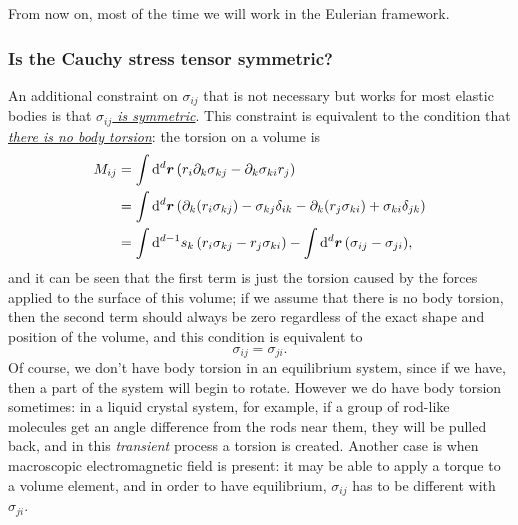 \documentclass[hyperref, a4paper]{article}
\begin{document}
From now on, most of the time we will work in the Eulerian framework.

\subsubsection{Is the Cauchy stress tensor symmetric?}

An additional constraint on $\sigma_{ij}$ that is not necessary 
but works for most elastic bodies is that 
\ul{\emph{$\sigma_{ij}$ is symmetric}}.
This constraint is equivalent to the condition 
that \ul{\emph{there is no body torsion}}:
the torsion on a volume is 
\begin{equation}
    \begin{aligned}
        M_{ij} &= \int \dd[d]{\vb*{r}} 
        \left(
            r_i \partial_k \sigma_{kj} - \partial_k \sigma_{ki} r_j
        \right) \\
        &= \int \dd[d]{\vb*{r}} \left(
            \partial_k(r_i \sigma_{kj}) - \sigma_{kj} \delta_{ik}
            - \partial_k (r_j \sigma_{ki}) + \sigma_{ki} \delta_{jk}
        \right) \\
        &= \int \dd[d-1]{s_k} (r_i \sigma_{kj} - r_j \sigma_{ki})
        - \int \dd[d]{\vb*{r}} (\sigma_{ij} - \sigma_{ji}),
    \end{aligned}
\end{equation}
and it can be seen that the first term is just the torsion caused 
by the forces applied to the surface of this volume;
if we assume that there is no body torsion,
then the second term should always be zero regardless 
of the exact shape and position of the volume,
and this condition is equivalent to 
\begin{equation}
    \sigma_{ij} = \sigma_{ji}.
    \label{eq:sigma-sym}
\end{equation}
Of course, we don't have body torsion in an equilibrium system,
since if we have, 
then a part of the system will begin to rotate.
However we do have body torsion sometimes: 
in a liquid crystal system, for example, 
if a group of rod-like molecules get an angle difference 
from the rods near them,
they will be pulled back, 
and in this \emph{transient} process a torsion is created.
Another case is when macroscopic electromagnetic field is present: 
it may be able to apply a torque to a volume element, 
and in order to have equilibrium, 
$\sigma_{ij}$ has to be different with $\sigma_{ji}$.
\end{document}

